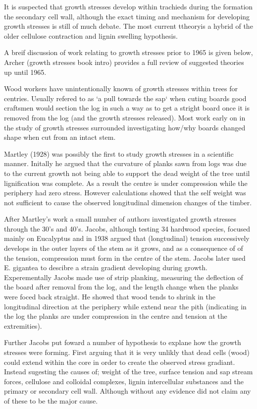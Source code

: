 \documentclass{article}
\begin{document}
It is suspected that growth stresses develop within trachieds during the
formation the secondary cell wall, although the exact timing and mechanism for
developing growth stresses is still of much debate. The most current ttheoryis
a hybrid of the older cellulose contraction and lignin swelling hypothesis.

A breif discussion of work relating to growth stresses prior to 1965 is given
below, Archer (growth stresses book intro) provides a full review of suggested theories
up until 1965.

Wood workers have unintentionally known of growth stresses within trees
for centries. Usually refered to as `a pull towards the sap` when cuting boards good
craftsmen would section the log in such a way as to get a stright board once it
is removed from the log (and the growth stresses released). Most work early on in
the study of growth stresses surrounded investigating how/why boards changed
shape when cut from an intact stem.

Martley (1928) was possibly the first to study growth stresses in a scientific
manner. Initally he argued that the curvature of planks sawn from logs was due
to the current growth not being able to support the dead weight of the tree until
lignification was complete. As a result the centre is under compression while
the periphery had zero stress. However calculations showed that the self weight
was not sufficient to cause the observed longitudinal dimension changes of the
timber.

After Martley's work a small number of authors investigated growth stresses
through the 30's and 40's. Jacobs, although testing 34 hardwood species, focused
mainly on Eucalyptus and in 1938 argued that (longtudinal) tension successively
develops in the outer layers of the stem as it grows, and as a consequence of of
the tension, compression must form in the centre of the stem. Jacobs later used
E. gigantea to descibre a strain gradient developing during growth.
Experementally Jacobs made use of strip planking, measuring the deflection of
the board after removal from the log, and the length change when the planks were
foced back straight. He showed that wood tends to shrink in the longitudinal
direction at the periphery while extend near the pith (indicating in the log
the planks are under compression in the centre and tension at the extremities).

Further Jacobs put foward a number of hypothesis to explane how the growth
stresses were forming. First arguing that it is very unlikly that dead cells
(wood) could extend within the core in order to create the observed stress
gradiant. Instead sugesting the causes of; weight of the tree, surface tension
and sap stream forces, cellulose and colloidal complexes, lignin intercellular
substances and the primary or secondary cell wall. Although without any evidence
did not claim any of these to be the major cause.
\end{document}
